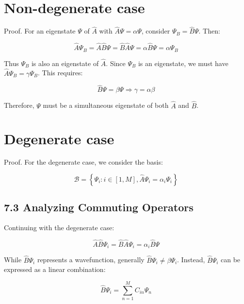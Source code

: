\documentclass[10pt]{article}
\begin{document}
\section*{Non-degenerate case}
Proof. For an eigenstate $\Psi$ of $\hat{A}$ with $\hat{A} \Psi=\alpha \Psi$, consider $\Psi_{B}=\hat{B} \Psi$. Then:

\begin{equation*}
\hat{A} \Psi_{B}=\hat{A} \hat{B} \Psi=\hat{B} \hat{A} \Psi=\alpha \hat{B} \Psi=\alpha \Psi_{B} \tag{7.23}
\end{equation*}

Thus $\Psi_{B}$ is also an eigenstate of $\hat{A}$. Since $\Psi_B$ is an eigenstate, we must have $\hat{A} \Psi_{B}=\gamma \Psi_{B}$. This requires:

\begin{equation*}
\hat{B} \Psi=\beta \Psi \Longrightarrow \gamma=\alpha \beta \tag{7.24}
\end{equation*}

Therefore, $\Psi$ must be a simultaneous eigenstate of both $\hat{A}$ and $\hat{B}$.

\section*{Degenerate case}
Proof. For the degenerate case, we consider the basis:

\begin{equation*}
\mathcal{B}=\left\{\Psi_{i}: i \in[1, M], \hat{A} \Psi_{i}=\alpha_{i} \Psi_{i}\right\} \tag{7.25}
\end{equation*}


\subsection*{7.3 Analyzing Commuting Operators}
Continuing with the degenerate case:

\begin{equation*}
\hat{A} \hat{B} \Psi_{i}=\hat{B} \hat{A} \Psi_{i}=\alpha_{i} \hat{B} \Psi \tag{7.26}
\end{equation*}

While $\hat{B} \Psi_{i}$ represents a wavefunction, generally $\hat{B} \Psi_{i} \neq \beta \Psi_{i}$. Instead, $\hat{B} \Psi_{i}$ can be expressed as a linear combination:

\begin{equation*}
\hat{B} \Psi_{i}=\sum_{n=1}^{M} C_{i n} \Psi_{n} \tag{7.27}
\end{equation*}
\end{document}
